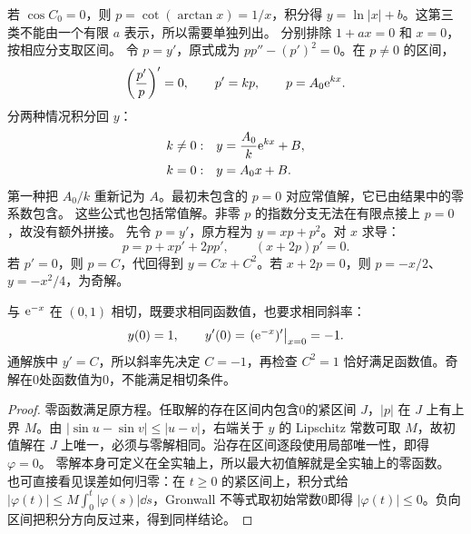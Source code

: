 若 $\cos C_0=0$，则 $p=\cot(\arctan x)=1/x$，积分得 $y=\ln|x|+b$。这第三类不能由一个有限 $a$ 表示，所以需要单独列出。
分别排除 $1+ax=0$ 和 $x=0$，按相应分支取区间。
令 $p=y'$，原式成为 $pp''-(p')^2=0$。在 $p\ne0$ 的区间，
\[
\left(\dfrac{p'}p\right)'=0,\qquad p'=kp,\qquad p=A_0\mathrm e^{kx}.
\]
分两种情况积分回 $y$：
\[
\begin{aligned}
k\ne0:&\quad y=\dfrac{A_0}{k}\mathrm e^{kx}+B,\\
k=0:&\quad y=A_0x+B.
\end{aligned}
\]
第一种把 $A_0/k$ 重新记为 $A$。最初未包含的 $p=0$ 对应常值解，它已由结果中的零系数包含。
这些公式也包括常值解。非零 $p$ 的指数分支无法在有限点接上 $p=0$，故没有额外拼接。
先令 $p=y'$，原方程为 $y=xp+p^2$。对 $x$ 求导：
\[
p=p+xp'+2pp',\qquad (x+2p)p'=0.
\]
若 $p'=0$，则 $p=C$，代回得到 $y=Cx+C^2$。若 $x+2p=0$，则 $p=-x/2$、$y=-x^2/4$，为奇解。

与 $\mathrm e^{-x}$ 在 $(0,1)$ 相切，既要求相同函数值，也要求相同斜率：
\[
y(0)=1,\qquad y'(0)=\left.(\mathrm e^{-x})'\right|_{x=0}=-1.
\]
通解族中 $y'=C$，所以斜率先决定 $C=-1$，再检查 $C^2=1$ 恰好满足函数值。奇解在0处函数值为0，不能满足相切条件。
\begin{proof}
零函数满足原方程。任取解的存在区间内包含0的紧区间 $J$，$|p|$ 在 $J$ 上有上界 $M$。由 $|\sin u-\sin v|\le|u-v|$，右端关于 $y$ 的 Lipschitz 常数可取 $M$，故初值解在 $J$ 上唯一，必须与零解相同。沿存在区间逐段使用局部唯一性，即得 $\varphi=0$。
零解本身可定义在全实轴上，所以最大初值解就是全实轴上的零函数。
也可直接看见误差如何归零：在 $t\ge0$ 的紧区间上，积分式给 $\displaystyle |\varphi(t)|\le M\int_0^t|\varphi(s)|\dd s$，Gronwall 不等式取初始常数0即得 $|\varphi(t)|\le0$。负向区间把积分方向反过来，得到同样结论。
\end{proof}

